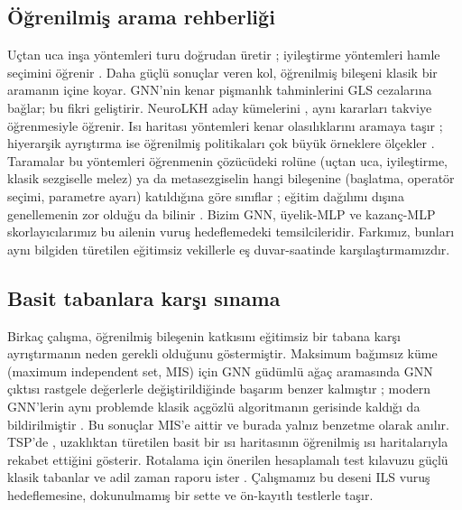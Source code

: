 \subsection{Öğrenilmiş arama rehberliği}
Uçtan uca inşa yöntemleri turu doğrudan üretir \citep{bello_2017_nco, dai_2017_s2v, kool_2019_attention, kwon_2020_pomo};
iyileştirme yöntemleri hamle seçimini öğrenir \citep{wu_2022_improvement}. Daha güçlü sonuçlar
veren kol, öğrenilmiş bileşeni klasik bir aramanın içine koyar. \citet{hudson_2022_gnngls} GNN'nin
kenar pişmanlık tahminlerini GLS cezalarına bağlar; \citet{sui_2024_neuralgls} bu fikri geliştirir.
NeuroLKH aday kümelerini \citep{xin_2021_neurolkh}, \citet{zheng_2023_rlkh} aynı kararları takviye
öğrenmesiyle öğrenir. Isı haritası yöntemleri kenar olasılıklarını aramaya taşır \citep{fu_2021_generalize, qiu_2022_dimes, sun_2023_difusco}; hiyerarşik ayrıştırma ise öğrenilmiş politikaları çok büyük örneklere ölçekler \citep{pan_2023_htsp}. Taramalar bu yöntemleri öğrenmenin çözücüdeki rolüne (uçtan uca, iyileştirme, klasik sezgiselle melez) ya da metasezgiselin hangi bileşenine (başlatma, operatör seçimi, parametre ayarı) katıldığına göre sınıflar \citep{bengio_2021_mlco, karimimamaghan_2022_mlmeta, sui_2025_survey}; eğitim dağılımı dışına
genellemenin zor olduğu da bilinir \citep{joshi_2020_generalization}. Bizim GNN, üyelik-MLP ve
kazanç-MLP skorlayıcılarımız bu ailenin vuruş hedeflemedeki temsilcileridir. Farkımız, bunları
aynı bilgiden türetilen eğitimsiz vekillerle eş duvar-saatinde karşılaştırmamızdır.

\subsection{Basit tabanlara karşı sınama}
Birkaç çalışma, öğrenilmiş bileşenin katkısını eğitimsiz bir tabana karşı ayrıştırmanın neden
gerekli olduğunu göstermiştir. Maksimum bağımsız küme (maximum independent set, MIS) için GNN güdümlü ağaç aramasında
GNN çıktısı rastgele değerlerle değiştirildiğinde başarım benzer kalmıştır \citep{bother_2022_wrong};
modern GNN'lerin aynı problemde klasik açgözlü algoritmanın gerisinde kaldığı da bildirilmiştir
\citep{angelini_2023_gnngreedy}. Bu sonuçlar MIS'e aittir ve burada yalnız benzetme olarak anılır.
TSP'de \citet{xia_2024_rethinking}, uzaklıktan türetilen basit bir ısı haritasının öğrenilmiş ısı
haritalarıyla rekabet ettiğini gösterir. Rotalama için önerilen hesaplamalı test kılavuzu güçlü
klasik tabanlar ve adil zaman raporu ister \citep{accorsi_2022_guidelines}. Çalışmamız bu deseni
ILS vuruş hedeflemesine, dokunulmamış bir sette ve ön-kayıtlı testlerle taşır.

